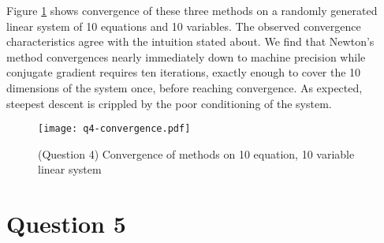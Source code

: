\documentclass{article}
\begin{document}
Figure \ref{Fig:Q4Convergence} shows convergence of these three methods on
a randomly generated linear system of 10 equations and 10
variables. The observed convergence characteristics agree with the
intuition stated about. We find that Newton's method convergences
nearly immediately down to machine precision while conjugate gradient
requires ten iterations, exactly enough to cover the 10 dimensions of
the system once, before reaching convergence. As expected, steepest
descent is crippled by the poor conditioning of the system.



\begin{figure}
  \center
  \texttt{[image: q4-convergence.pdf]}
  \caption{(Question 4) Convergence of methods on 10 equation, 10 variable linear system}
  \label{Fig:Q4Convergence}
\end{figure}

\section{Question 5}


\end{document}
